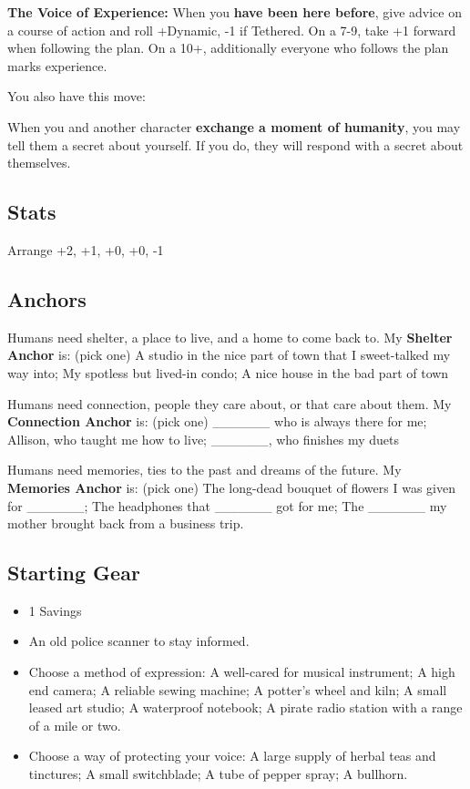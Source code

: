 \documentclass[10pt,twoside,openright]{memoir}
\begin{document}
\textbf{The Voice of Experience:} When you \textbf{have been here
before}, give advice on a course of action and roll +Dynamic, -1 if
Tethered. On a 7-9, take +1 forward when following the plan. On a 10+,
additionally everyone who follows the plan marks experience.

You also have this move:

When you and another character \textbf{exchange a moment of humanity},
you may tell them a secret about yourself. If you do, they will respond
with a secret about themselves.

\hypertarget{stats-8}{%
\subsection{Stats}\label{stats-8}}

Arrange +2, +1, +0, +0, -1

\hypertarget{anchors-7}{%
\subsection{Anchors}\label{anchors-7}}

Humans need shelter, a place to live, and a home to come back to. My
\textbf{Shelter Anchor} is: (pick one) A studio in the nice part of town
that I sweet-talked my way into; My spotless but lived-in condo; A nice
house in the bad part of town

Humans need connection, people they care about, or that care about them.
My \textbf{Connection Anchor} is: (pick one) \_\_\_\_\_\_ who is always
there for me; Allison, who taught me how to live; \_\_\_\_\_\_, who
finishes my duets

Humans need memories, ties to the past and dreams of the future. My
\textbf{Memories Anchor} is: (pick one) The long-dead bouquet of flowers
I was given for \_\_\_\_\_\_; The headphones that \_\_\_\_\_\_ got for
me; The \_\_\_\_\_\_ my mother brought back from a business trip.

\hypertarget{starting-gear-7}{%
\subsection{Starting Gear}\label{starting-gear-7}}

\begin{itemize}
\tightlist
\item
  1 Savings
\item
  An old police scanner to stay informed.
\item
  Choose a method of expression: A well-cared for musical instrument; A
  high end camera; A reliable sewing machine; A potter's wheel and kiln;
  A small leased art studio; A waterproof notebook; A pirate radio
  station with a range of a mile or two.
\item
  Choose a way of protecting your voice: A large supply of herbal teas
  and tinctures; A small switchblade; A tube of pepper spray; A
  bullhorn.
\end{itemize}
\end{document}

